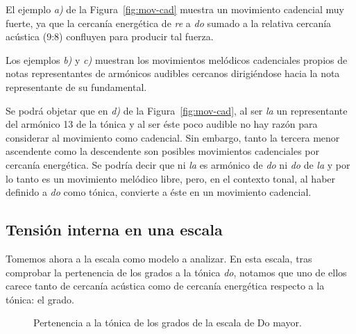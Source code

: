 \documentclass[a4paper,11pt]{article}
\begin{document}
\begin{multicols}{2}
  El ejemplo \emph{a)} de la Figura~\ref{fig:mov-cad} muestra un movimiento cadencial muy fuerte, ya que la cercanía energética de \emph{re} a \emph{do} sumado a la relativa cercanía acústica (9:8) confluyen para producir tal fuerza.

  Los ejemplos \emph{b)} y \emph{c)} muestran los movimientos melódicos cadenciales propios de notas representantes de armónicos audibles cercanos dirigiéndose hacia la nota representante de su fundamental.

  Se podrá objetar que en \emph{d)} de la Figura~\ref{fig:mov-cad}, al ser \emph{la} un representante del armónico 13 de la tónica y al ser éste poco audible no hay razón para considerar al movimiento  como cadencial. Sin embargo, tanto la tercera menor ascendente como la descendente son posibles movimientos cadenciales por cercanía energética. Se podría decir que ni \emph{la} es armónico de \emph{do} ni \emph{do} de \emph{la} y por lo tanto es un movimiento melódico libre, pero, en el contexto tonal, al haber definido a \emph{do} como tónica, convierte a éste en un movimiento cadencial.

    \subsection{Tensión interna en una escala}\label{subsec:tension}

    Tomemos ahora a la escala  como modelo a analizar. En esta escala, tras comprobar la pertenencia de los grados a la tónica \emph{do}, notamos que uno de ellos carece tanto de cercanía acústica como de cercanía energética respecto a la tónica: el  grado.
\end{multicols}

\begin{figure}[ht]
\centering
\caption{Pertenencia a la tónica de los grados de la escala de Do mayor. }\label{fig:pertenencia-do}
\end{figure}
\end{document}
